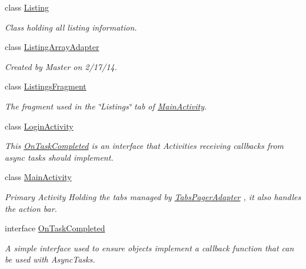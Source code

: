 \begin{DoxyCompactItemize}
class \hyperlink{classcom_1_1lakehead_1_1textbookmarket_1_1_listing}{Listing}
\begin{DoxyCompactList}\small\item\em Class holding all listing information. \end{DoxyCompactList}\item 
class \hyperlink{classcom_1_1lakehead_1_1textbookmarket_1_1_listing_array_adapter}{Listing\-Array\-Adapter}
\begin{DoxyCompactList}\small\item\em Created by Master on 2/17/14. \end{DoxyCompactList}\item 
class \hyperlink{classcom_1_1lakehead_1_1textbookmarket_1_1_listings_fragment}{Listings\-Fragment}
\begin{DoxyCompactList}\small\item\em The fragment used in the \char`\"{}\-Listings\char`\"{} tab of \hyperlink{classcom_1_1lakehead_1_1textbookmarket_1_1_main_activity}{Main\-Activity}. \end{DoxyCompactList}\item 
class \hyperlink{classcom_1_1lakehead_1_1textbookmarket_1_1_login_activity}{Login\-Activity}
\begin{DoxyCompactList}\small\item\em This \hyperlink{interfacecom_1_1lakehead_1_1textbookmarket_1_1_on_task_completed}{On\-Task\-Completed} is an interface that Activities receiving callbacks from async tasks should implement. \end{DoxyCompactList}\item 
class \hyperlink{classcom_1_1lakehead_1_1textbookmarket_1_1_main_activity}{Main\-Activity}
\begin{DoxyCompactList}\small\item\em Primary Activity Holding the tabs managed by \hyperlink{classcom_1_1lakehead_1_1textbookmarket_1_1_tabs_pager_adapter}{Tabs\-Pager\-Adapter} , it also handles the action bar. \end{DoxyCompactList}\item 
interface \hyperlink{interfacecom_1_1lakehead_1_1textbookmarket_1_1_on_task_completed}{On\-Task\-Completed}
\begin{DoxyCompactList}\small\item\em A simple interface used to ensure objects implement a callback function that can be used with Async\-Tasks. \end{DoxyCompactList}\item 

\end{DoxyCompactItemize}
